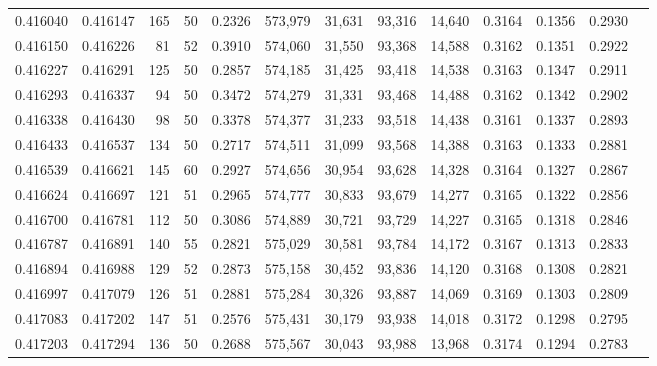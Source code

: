 \begin{tabular}{rrrrrrrrrrrrr}
0.416040 & 0.416147 &   165 &  50 &                                     0.2326 & 573,979 &  31,631 &  93,316 &  14,640 & 0.3164 & 0.1356 & 0.2930 \\
0.416150 & 0.416226 &    81 &  52 &                                     0.3910 & 574,060 &  31,550 &  93,368 &  14,588 & 0.3162 & 0.1351 & 0.2922 \\
0.416227 & 0.416291 &   125 &  50 &                                     0.2857 & 574,185 &  31,425 &  93,418 &  14,538 & 0.3163 & 0.1347 & 0.2911 \\
0.416293 & 0.416337 &    94 &  50 &                                     0.3472 & 574,279 &  31,331 &  93,468 &  14,488 & 0.3162 & 0.1342 & 0.2902 \\
0.416338 & 0.416430 &    98 &  50 &                                     0.3378 & 574,377 &  31,233 &  93,518 &  14,438 & 0.3161 & 0.1337 & 0.2893 \\
0.416433 & 0.416537 &   134 &  50 &                                     0.2717 & 574,511 &  31,099 &  93,568 &  14,388 & 0.3163 & 0.1333 & 0.2881 \\
0.416539 & 0.416621 &   145 &  60 &                                     0.2927 & 574,656 &  30,954 &  93,628 &  14,328 & 0.3164 & 0.1327 & 0.2867 \\
0.416624 & 0.416697 &   121 &  51 &                                     0.2965 & 574,777 &  30,833 &  93,679 &  14,277 & 0.3165 & 0.1322 & 0.2856 \\
0.416700 & 0.416781 &   112 &  50 &                                     0.3086 & 574,889 &  30,721 &  93,729 &  14,227 & 0.3165 & 0.1318 & 0.2846 \\
0.416787 & 0.416891 &   140 &  55 &                                     0.2821 & 575,029 &  30,581 &  93,784 &  14,172 & 0.3167 & 0.1313 & 0.2833 \\
0.416894 & 0.416988 &   129 &  52 &                                     0.2873 & 575,158 &  30,452 &  93,836 &  14,120 & 0.3168 & 0.1308 & 0.2821 \\
0.416997 & 0.417079 &   126 &  51 &                                     0.2881 & 575,284 &  30,326 &  93,887 &  14,069 & 0.3169 & 0.1303 & 0.2809 \\
0.417083 & 0.417202 &   147 &  51 &                                     0.2576 & 575,431 &  30,179 &  93,938 &  14,018 & 0.3172 & 0.1298 & 0.2795 \\
0.417203 & 0.417294 &   136 &  50 &                                     0.2688 & 575,567 &  30,043 &  93,988 &  13,968 & 0.3174 & 0.1294 & 0.2783 \\

\end{tabular}
